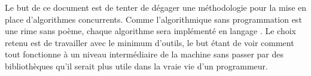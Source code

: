 Le but de ce document est de tenter de dégager une méthodologie pour la mise en place d'algorithmes concurrents.
Comme l'algorithmique sans programmation est une rime sans poème, chaque algorithme sera implémenté en langage \java. 
Le choix retenu est de travailler avec le minimum d'outils, le but étant de voir comment tout fonctionne à un niveau intermédiaire de la machine sans passer par des bibliothèques qu'il serait plus utile dans la vraie vie d'un programmeur.